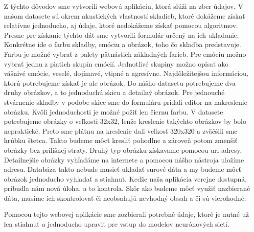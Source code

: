 Z týchto dôvodov sme vytvorili webovú aplikáciu, ktorá slúži na zber údajov.
V našom datasete sú okrem akustických vlastností skladieb, ktoré dokážeme získať relatívne jednoducho, aj údaje, ktoré nedokážeme získať pomocou algoritmov.
Presne pre získanie týchto dát sme vytvorili formulár určený na ich ukladanie.
Konkrétne ide o farbu skladby, emóciu a obrázok, toho čo skladba predstavuje.
Farbu je možné vybrať z palety pätnástich základných farieb.
Pre emóciu možno vybrať jednu z piatich skupín emócií.
Jednotlivé skupiny možno opísať ako vášnivé emócie, veselé, dojímavé, vtipné a agresívne.
Najdôležitejšou informáciou, ktorú potrebujeme získať je ale obrázok.
Do nášho datasetu potrebujeme dva druhy obrázkov, a to jednoduchú skicu a detailný obrázok.
Pre jednouché stvárnenie skladby v podobe skice sme do formuláru pridali editor na nakreslenie obrázku.
Kvôli jednoduchosti je možné požiť len čiernu farbu.
V datasete potrebujeme obrázky o veľkosti 32x32, lenže kreslenie takýchto obrázkov by bolo nepraktické.
Preto sme plátnu na kreslenie dali veľkosť 320x320 a zväčšili sme hrúbku štetca.
Takto budeme môcť kresliť pohodlne a zároveň potom zmenšiť obrázky bez prílišnej straty.
Druhý typ obrázku získavame pomocou url adresy.
Detailnejšie obrázky vyhľadáme na internete a pomocou nášho nástroja uložíme adresu.
Databáza takto nebude musieť ukladať surové dáta a my budeme môcť obrázok jednoducho vyhľadať a stiahnuť.
Keďže naša aplikácia verejne dostupná, pribudla nám nová úloha, a to kontrola.
Skôr ako budeme môcť využiť nazbierané dáta, musíme ich skontrolovať či neobsahujú nevhodný obsah a či sú vierohodné.

Pomocou tejto webovej aplikácie sme zozbierali potrebné údaje, ktoré je nutné už len stiahnuť a jednoducho upraviť pre vstup do modelov neurónových sietí.
